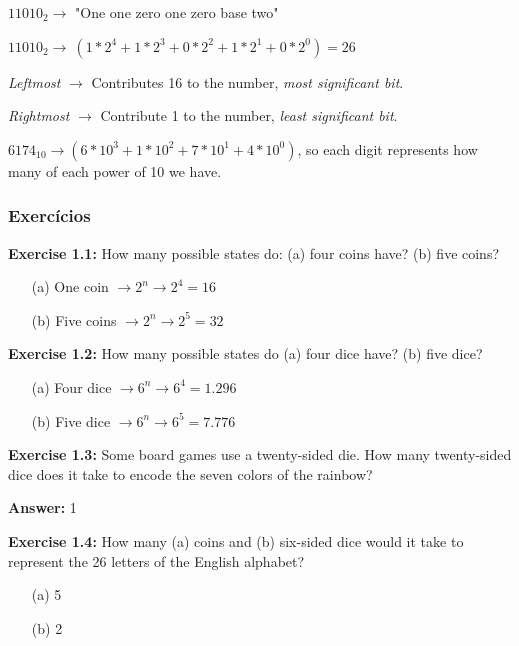 \documentclass[12pt]{article}
\begin{document}
\(11010_{2} \rightarrow\) "One one zero one zero base two"

\(11010_{2} \rightarrow\ (1*2^{4}+1*2^{3}+0*2^{2}+1*2^{1}+0*2^0) = 26\)

\textit{Leftmost} \(\rightarrow\) Contributes 16 to the number, \textit{most significant bit}.

\textit{Rightmost} \(\rightarrow\) Contribute 1 to the number, \textit{least significant bit}.

\(6174_{10} \rightarrow (6*10^{3}+1*10^{2}+7*10^{1}+4*10^{0})\), so each digit represents how many of each power of 10 we have.



\subsubsection{Exercícios}

\textbf{Exercise 1.1:} How many possible states do: (a) four coins have? (b) five coins?

\begin{enumerate}
	\item[(a)] One coin \(\rightarrow 2^{n} \rightarrow 2^{4} = 16\)
	\item[(b)] Five coins \(\rightarrow 2^{n} \rightarrow 2^{5} = 32\)
\end{enumerate}

\textbf{Exercise 1.2:} How many possible states do (a) four dice have? (b) five dice?

\begin{enumerate}
	\item[(a)] Four dice \(\rightarrow 6^{n} \rightarrow 6^{4} = 1.296\)
	\item[(b)] Five dice \(\rightarrow 6^{n} \rightarrow 6^{5} = 7.776\)
\end{enumerate}

\textbf{Exercise 1.3:} Some board games use a twenty-sided die. How many twenty-sided dice does it take to encode the seven colors of the rainbow?

\textbf{Answer:} 1

\textbf{Exercise 1.4:} How many (a) coins and (b) six-sided dice would it take to represent the 26 letters of the English alphabet?

\begin{enumerate}
	\item[(a)] 5
	\item[(b)] 2
\end{enumerate}
\end{document}

